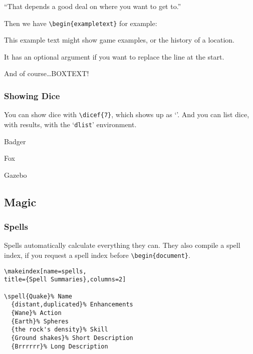 \documentclass[a4paper,openany]{book}
\begin{document}
\begin{multicols}{2}
\begin{speechtext}
  ``That depends a good deal on where you want to get to.''

\end{speechtext}

Then we have \verb"\begin{exampletext}" for example:

\begin{exampletext}
  This example text might show game examples, or the history of a location.

  It has an optional argument if you want to replace the line at the start.

\end{exampletext}

\begin{boxtext}
  And of course\ldots BOXTEXT!

\end{boxtext}

\subsubsection{Showing Dice}

You can show dice with \verb"\dicef{7}", which shows up as `'.
And you can list dice, with results, with the `\texttt{dlist}' environment.

\begin{dlist}
  \item Badger
  \item Fox
  \item Gazebo
\end{dlist}

\subsection{Magic}

\subsubsection{Spells}

Spells automatically calculate everything they can.
They also compile a spell index, if you request a spell index before \verb"\begin{document}".

\begin{verbatim}
\makeindex[name=spells,
title={Spell Summaries},columns=2]

\spell{Quake}% Name
  {distant,duplicated}% Enhancements
  {Wane}% Action
  {Earth}% Spheres
  {the rock's density}% Skill
  {Ground shakes}% Short Description
  {Brrrrrr}% Long Description


\end{verbatim}
\end{multicols}
\end{document}
